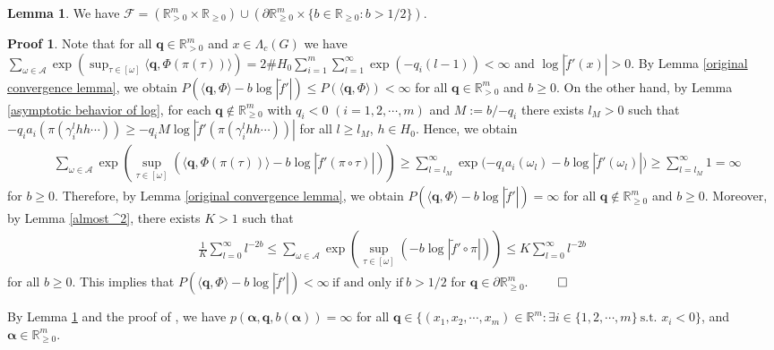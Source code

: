 \documentclass{article}
\theoremstyle{definition}
\newtheorem{lemma}[thm]{Lemma}
\newtheorem*{pf}{Proof}
\begin{document}
\begin{lemma}\label{convergence lemma}
    We have $\mathcal{F}=(\mathbb{R}_{>0}^m\times\mathbb{R}_{\geq 0})\cup(\partial\mathbb{R}_{\geq 0}^m\times\{b\in\mathbb{R}_{\geq 0}:b>1/2\})$.
\end{lemma}
\begin{pf}
    Note that for all $\boldsymbol{q}\in\mathbb{R}_{>0}^m$ and $x\in\Lambda_c(G)$ we have $\sum_{\omega \in \mathcal{A}}\exp \left(\sup_{\tau \in [\omega]}  \langle\boldsymbol{q},\Phi(\pi(\tau))\rangle \right)\nonumber
=2\#H_0\sum_{i=1}^m\sum_{l=1}^{\infty}\exp(-q_i(l-1))<\infty\nonumber$ and $\log|\tilde f'(x)|>0$. By Lemma \ref{original convergence lemma}, we obtain 
    $P(\langle \boldsymbol{q}, \Phi \rangle -b \log|\tilde f'|)\leq P(\langle\boldsymbol{q},\Phi\rangle) < \infty$
 for all $\boldsymbol{q}\in\mathbb{R}^m_{>0}$ and $b\geq0$. On the other hand, by Lemma \ref{asymptotic behavior of log}, for each $\boldsymbol{q}\notin\mathbb{R}_{\geq 0}^m$ with $q_i<0$ $(i=1,2,\cdots,m)$ and
 $M:={b}/{-q_i}$ there exists $l_M >0$ such that 
$-q_i a_i(\pi(\gamma_i^{l}hh\cdots))\geq -q_iM\log|\tilde f'(\pi(\gamma_i^{l}hh\cdots))|$
  for all $l\geq l_M$, $h\in H_0$. Hence, we obtain 
\begin{align}
&\sum_{\omega \in \mathcal{A}}\exp \left(\sup_{\tau \in [\omega]}  (\langle\boldsymbol{q},\Phi(\pi(\tau))\rangle-b\log|\tilde f'(\pi\circ\tau)|) \right)\nonumber 
 \geq  \sum_{l=l_M}^\infty\exp{(-q_ia_i(\omega_{l})-b \log |\tilde f'(\omega_{l})|})\geq\sum_{l=l_M}^\infty1=\infty\nonumber
\end{align}
for $b\geq0$. 
Therefore, by Lemma \ref{original convergence lemma}, we obtain 
$P(\langle \boldsymbol{q}, \Phi \rangle -b \log|\tilde f'|)=\infty$   
 for all $\boldsymbol{q}\notin\mathbb{R}_{\geq 0}^m$ and $b\geq0$.
 Moreover, by Lemma \ref{almost ^2}, there exists $K>1$ such that
 \begin{align}\label{proof of Bowen's formula}
     \frac{1}{K}\sum_{l=0}^\infty l^{-2b}\leq\sum_{\omega\in\mathcal{A}} \exp\left(\sup_{\tau\in[\omega]}(-b\log|\tilde f'\circ\pi|)\right)\leq K\sum_{l=0}^\infty l^{-2b}
 \end{align}
 for all $b\geq0$. This implies that
     $P(\langle\boldsymbol{q},\Phi\rangle-b\log|\tilde f'|)<\infty
 \ \text{if\ and\ only\ if}\  b>{1}/{2}$  for $\boldsymbol{q}\in\partial\mathbb{R}_{\geq 0}^m$.
 $\qed$
\end{pf}
By Lemma \ref{convergence lemma} and the  proof of \cite[Proposition 2.1.9]{mauldin2003graph}, we have  $\nonumber
    p(\boldsymbol{\alpha},\boldsymbol{q},b(\boldsymbol{\alpha}))=\infty$
for all $\boldsymbol{q} \in  \lbrace (x_1,x_2,\cdots,x_m)\in \mathbb{R}^m:\exists i \in\lbrace1,2,\cdots,m\rbrace\ \text{s.t.\ } x_i<0\rbrace$, and $\boldsymbol{\alpha}\in \mathbb{R}^m_{\geq 0}$.
\end{document}
